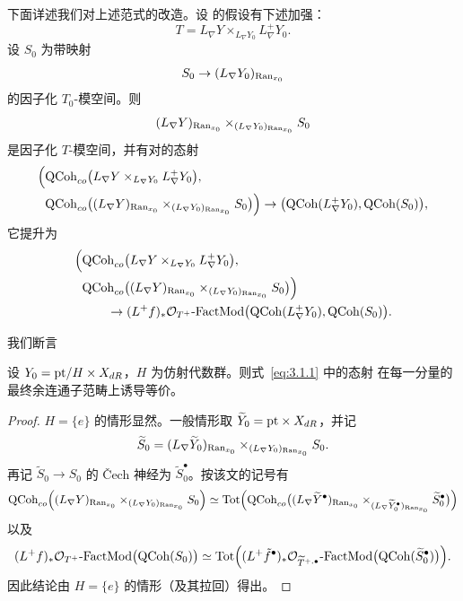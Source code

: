 下面详述我们对上述范式的改造。设 \cite[推论 4.5.7]{ABC+24a} 的假设有下述加强：
\[
T=L_\nabla Y\times_{L_\nabla Y_0}L^+_\nabla Y_0 .
\]
设 $S_0$ 为带映射
\[
S_0\to (L_\nabla Y_0)_{\mathrm{Ran}_{x_0}}
\]
的因子化 $T_0$-模空间。则
\[
(L_\nabla Y)_{\mathrm{Ran}_{x_0}}\times_{(L_\nabla Y_0)_{\mathrm{Ran}_{x_0}}}S_0
\]
是因子化 $T$-模空间，并有对的态射
\begin{align*}
\Bigl(&\mathrm{QCoh}_{co}\bigl(L_\nabla Y\times_{L_\nabla Y_0}L^+_\nabla Y_0\bigr),\\
&\mathrm{QCoh}_{co}\bigl((L_\nabla Y)_{\mathrm{Ran}_{x_0}}
\times_{(L_\nabla Y_0)_{\mathrm{Ran}_{x_0}}}S_0\bigr)\Bigr)
\to \bigl(\mathrm{QCoh}(L^+_\nabla Y_0),\mathrm{QCoh}(S_0)\bigr),
\end{align*}
它提升为
\begin{equation}
\begin{aligned}
\Bigl(&\mathrm{QCoh}_{co}\bigl(L_\nabla Y\times_{L_\nabla Y_0}L^+_\nabla Y_0\bigr),\\
&\mathrm{QCoh}_{co}\bigl((L_\nabla Y)_{\mathrm{Ran}_{x_0}}
\times_{(L_\nabla Y_0)_{\mathrm{Ran}_{x_0}}}S_0\bigr)\Bigr)\\
&\qquad\to
(L^+f)_*\mathcal{O}_{T^+}\text{-}\mathrm{FactMod}
\bigl(\mathrm{QCoh}(L^+_\nabla Y_0),\mathrm{QCoh}(S_0)\bigr).
\end{aligned}
\label{eq:3.1.1}
\end{equation}

我们断言

\begin{theorem}
\label{thm:3.1.5.2}
设 $Y_0=\mathrm{pt}/H\times X_{dR}$，$H$ 为仿射代数群。则式~\eqref{eq:3.1.1} 中的态射
在每一分量的最终余连通子范畴上诱导等价。
\end{theorem}

\begin{proof}
$H=\{e\}$ 的情形显然。一般情形取 $\widetilde{Y}_0=\mathrm{pt}\times X_{dR}$，并记
\[
\widetilde{S}_0=(L_\nabla\widetilde{Y}_0)_{\mathrm{Ran}_{x_0}}
\times_{(L_\nabla Y_0)_{\mathrm{Ran}_{x_0}}}S_0 .
\]
再记 $\widetilde{S}_0\to S_0$ 的 Čech 神经为 $\widetilde{S}^{\bullet}_0$。按该文的记号有
\[
\mathrm{QCoh}_{co}\Bigl((L_\nabla Y)_{\mathrm{Ran}_{x_0}}
\times_{(L_\nabla Y_0)_{\mathrm{Ran}_{x_0}}}S_0\Bigr)
\simeq \operatorname{Tot}\Bigl(\mathrm{QCoh}_{co}\bigl((L_\nabla\widetilde{Y}^{\bullet})_{\mathrm{Ran}_{x_0}}
\times_{(L_\nabla\widetilde{Y}^{\bullet}_0)_{\mathrm{Ran}_{x_0}}}\widetilde{S}^{\bullet}_0\bigr)\Bigr)
\]
以及
\[
(L^+f)_*\mathcal{O}_{T^+}\text{-}\mathrm{FactMod}\bigl(\mathrm{QCoh}(S_0)\bigr)
\simeq \operatorname{Tot}\Bigl((L^+\tilde f^{\bullet})_*\mathcal{O}_{\widetilde{T}^{+,\bullet}}
\text{-}\mathrm{FactMod}\bigl(\mathrm{QCoh}(\widetilde{S}^{\bullet}_0)\bigr)\Bigr).
\]
因此结论由 $H=\{e\}$ 的情形（及其拉回）得出。
\end{proof}
